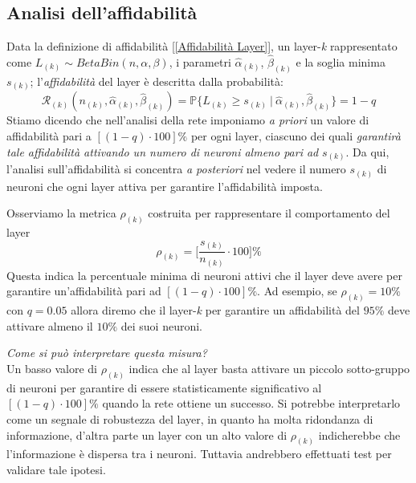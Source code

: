 \documentclass[10pt]{article} %
\begin{document}
\subsection{Analisi dell'affidabilità}
Data la definizione di affidabilità [\ref{Affidabilità Layer}], un layer-\textit{k} rappresentato come $L_{(k)}\sim BetaBin(n, \alpha, \beta)$, i parametri $\hat{\alpha}_{(k)}$, $\hat{\beta}_{(k)}$ e la soglia minima $s_{(k)}$; l'\textit{affidabilità} del layer è descritta dalla probabilità:
\begin{equation}
    \mathcal{R}_{(k)}(n_{(k)}, \hat{\alpha}_{(k)}, \hat{\beta}_{(k)}) = \mathbb{P}\{L_{(k)}\ge s_{(k)}\ |\ \hat{\alpha}_{(k)}, \hat{\beta}_{(k)}\} = 1-q
\end{equation}
Stiamo dicendo che nell'analisi della rete imponiamo \textit{a priori} un valore di affidabilità pari a $[(1-q)\cdot 100]\%$ per ogni layer, ciascuno dei quali \textit{garantirà tale affidabilità attivando un numero di neuroni almeno pari ad} $s_{(k)}$. Da qui, l'analisi sull'affidabilità si concentra \textit{a posteriori} nel vedere il numero $s_{(k)}$ di neuroni che ogni layer attiva per garantire l'affidabilità imposta.

Osserviamo la metrica $\rho_{(k)}$ costruita per rappresentare il comportamento del layer
\begin{equation}
    \rho_{(k)} = \bigg[\dfrac{s_{(k)}}{n_{(k)}}\cdot100\bigg]\%
\end{equation}
Questa indica la percentuale minima di neuroni attivi che il layer deve avere per garantire un'affidabilità pari ad $[(1-q)\cdot 100]\%$. Ad esempio, se $\rho_{(k)}=10\%$ con $q=0.05$ allora diremo che il layer-\textit{k} per garantire un affidabilità del $95\%$ deve attivare almeno il $10\%$ dei suoi neuroni.

\textit{Come si può interpretare questa misura?}\\
Un basso valore di $\rho_{(k)}$ indica che al layer basta attivare un piccolo sotto-gruppo di neuroni per garantire di essere statisticamente significativo al $[(1-q)\cdot100]\%$ quando la rete ottiene un successo. Si potrebbe interpretarlo come un segnale di robustezza del layer, in quanto ha molta ridondanza di informazione, d'altra parte un layer con un alto valore di $\rho_{(k)}$ indicherebbe che l'informazione è dispersa tra i neuroni. Tuttavia andrebbero effettuati test per validare tale ipotesi.
\end{document}
